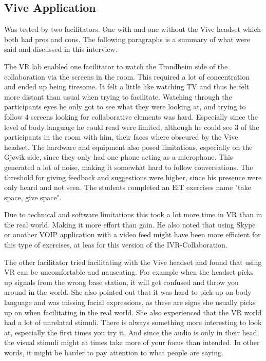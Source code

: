         \subsection{Vive Application} %
        Was tested by two facilitators. One with and one without the Vive headset which both had pros and cons. The following paragraphs is a summary of what were said and discussed in this interview.
        
        The VR lab enabled one facilitator to watch the Trondheim side of the collaboration via the screens in the room. This required a lot of concentration and ended up being tiresome. It felt a little like watching TV and thus he felt more distant than usual when trying to facilitate. Watching through the participants eyes he only got to see what they were looking at, and trying to follow 4 screens looking for collaborative elements was hard. Especially since the level of body language he could read were limited, although he could see 3 of the participants in the room with him, their faces where obscured by the Vive headset. The hardware and equipment also posed limitations, especially on the Gjøvik side, since they only had one phone acting as a microphone. This generated a lot of noise, making it somewhat hard to follow conversations. The threshold for giving feedback and suggestions were higher, since his presence were only heard and not seen. The students completed an EiT exercises name "take space, give space". 
        
        
        Due to technical and software limitations this took a lot more time in VR than in the real world. Making it more effort than gain. He also noted that using Skype or another VOIP application with a video feed might have been more efficient for this type of exercises, at leas for this version of the IVR-Collaboration.
        
        The other facilitator tried facilitating with the Vive headset and found that using VR can be uncomfortable and nauseating. For example when the headset picks up signals from the wrong base station, it will get confused and throw you around in the world. She also pointed out that it was hard to pick up on body language and was missing facial expressions, as these are signs she usually picks up on when facilitating in the real world. She also experienced that the VR world had a lot of unrelated stimuli. There is always something more interesting to look at, especially the first times you try it. And since the audio is only in their head, the visual stimuli might at times take more of your focus than intended. In other words, it might be harder to pay attention to what people are saying.
        

